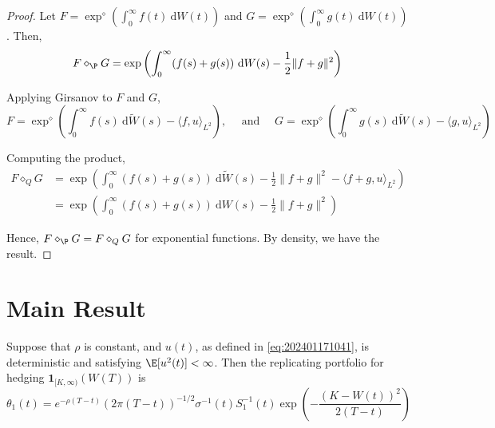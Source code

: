 \begin{proof}
Let $F = \exp^\diamond \left( \int_0^\infty f(t) ~\mathrm{d}W(t) \right)$ and $G = \exp^\diamond \left( \int_0^\infty g(t) ~\mathrm{d}W(t) \right)$. Then, 
\begin{equation*}
\begin{aligned}
F \diamond_\P G = \exp \left( \int_0^\infty (f(s) + g(s)) ~\mathrm{d}W(s) - \frac{1}{2} \|f + g\|^2 \right)
\end{aligned}
\end{equation*}

Applying Girsanov to $F$ and $G$,
\[
F = \exp^\diamond \left( \int_0^\infty f(s) ~\mathrm{d}\widetilde{W}(s) - \langle f, u \rangle_{L^2} \right), 
\quad \text{ and } \quad
G = \exp^\diamond \left( \int_0^\infty g(s) ~\mathrm{d}\widetilde{W}(s) - \langle g, u \rangle_{L^2} \right) 
\]

Computing the product,
\begin{equation*}
\begin{aligned}
F \diamond_Q G &= \exp \left( \int_0^\infty (f(s) + g(s)) ~\mathrm{d}\widetilde{W}(s) - \frac{1}{2} \|f + g\|^2 - \langle f+g, u \rangle_{L^2} \right) \\
&= \exp \left( \int_0^\infty (f(s) + g(s)) ~\mathrm{d}W(s) - \frac{1}{2} \|f + g\|^2 \right)
\end{aligned}
\end{equation*}

Hence, $F \diamond_\P G = F \diamond_Q G$ for exponential functions. By density, we have the result.
\end{proof}

\section{Main Result}

\begin{theorem}
Suppose that $\rho$ is constant, and $u(t)$, as defined in \eqref{eq:202401171041}, is deterministic and satisfying $\E [u^2(t)] < \infty$. Then the replicating portfolio for hedging $\mathbf{1}_{[K, \infty)}(W(T))$ is 
\begin{equation}\label{eq:replicating-digital}
\theta_1(t) = e^{-\rho(T-t)} (2 \pi (T-t))^{-1/2} \sigma^{-1}(t) S_1^{-1}(t) \exp \left( - \frac{(K - W(t))^2}{2(T-t)} \right)
\end{equation}
\end{theorem}

